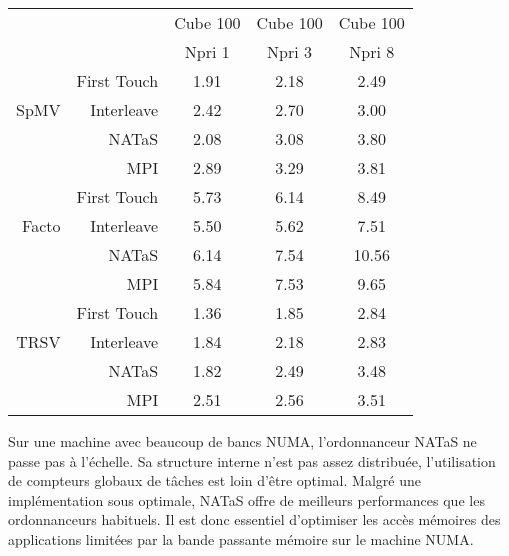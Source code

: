 \begin{center}
  \begin{tabular}{|r|r|c|c|c|}
    \hline
       & & Cube 100 & Cube 100 & Cube 100 \\
       & & Npri 1   & Npri 3   & Npri 8 \\
    \hline
&        First Touch &	1.91 &	2.18 &	2.49 \\
SpMV &   Interleave  &	2.42 &	2.70 &	3.00 \\
&        NATaS       &	2.08 &	3.08 &	3.80 \\
&        MPI         &	2.89 &	3.29 &	3.81 \\
    \hline
&        First Touch &	5.73 &	6.14 &	8.49 \\
Facto &  Interleave  &	5.50 &	5.62 &	7.51 \\
&        NATaS       &	6.14 &	7.54 &	10.56 \\
&        MPI         &	5.84 &	7.53 &	9.65 \\
    \hline
&        First Touch &	1.36 &	1.85 &	2.84 \\
TRSV &   Interleave  &	1.84 &	2.18 &	2.83 \\
&        NATaS       &	1.82 &	2.49 &	3.48 \\
&        MPI         &	2.51 &	2.56 &	3.51 \\
    \hline
  \end{tabular}
  \label{tab:rostand_sum}
\end{center}


Sur une machine avec beaucoup de bancs NUMA, l'ordonnanceur NATaS ne passe pas à l'échelle.
%
Sa structure interne n'est pas assez distribuée, l'utilisation de compteurs globaux de tâches est loin d'être optimal.
%
Malgré une implémentation sous optimale, NATaS offre de meilleurs performances que les ordonnanceurs habituels.
%
Il est donc essentiel d'optimiser les accès mémoires des applications limitées par la bande passante mémoire sur le machine NUMA.
